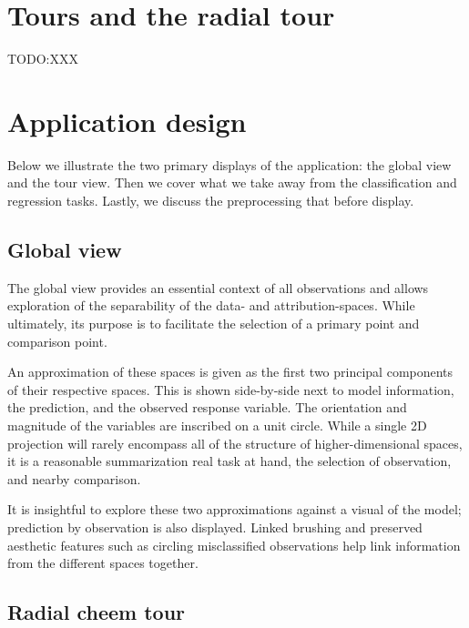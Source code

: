 \documentclass[
  article]{article}
\begin{document}
\hypertarget{tours-and-the-radial-tour}{%
\section{Tours and the radial tour}\label{tours-and-the-radial-tour}}

TODO:XXX

\hypertarget{sec:applicationdesign}{%
\section{Application design}\label{sec:applicationdesign}}

Below we illustrate the two primary displays of the application: the global view and the tour view. Then we cover what we take away from the classification and regression tasks. Lastly, we discuss the preprocessing that before display.

\hypertarget{global-view}{%
\subsection{Global view}\label{global-view}}

The global view provides an essential context of all observations and allows exploration of the separability of the data- and attribution-spaces. While ultimately, its purpose is to facilitate the selection of a primary point and comparison point.

An approximation of these spaces is given as the first two principal components of their respective spaces. This is shown side-by-side next to model information, the prediction, and the observed response variable. The orientation and magnitude of the variables are inscribed on a unit circle. While a single 2D projection will rarely encompass all of the structure of higher-dimensional spaces, it is a reasonable summarization real task at hand, the selection of observation, and nearby comparison.

It is insightful to explore these two approximations against a visual of the model; prediction by observation is also displayed. Linked brushing and preserved aesthetic features such as circling misclassified observations help link information from the different spaces together.

\hypertarget{radial-cheem-tour}{%
\subsection{Radial cheem tour}\label{radial-cheem-tour}}
\end{document}
